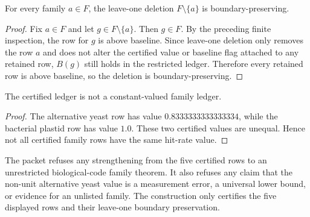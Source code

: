 \begin{theorem}
\label{thm:bioreality-q-six-family-leave-one-boundary-preservation}
For every family $a\in F$, the leave-one deletion $F\setminus\{a\}$ is boundary-preserving.
\end{theorem}

\begin{proof}
Fix $a\in F$ and let $g\in F\setminus\{a\}$.  Then $g\in F$.  By the preceding finite inspection, the row for $g$ is above baseline.  Since leave-one deletion only removes the row $a$ and does not alter the certified value or baseline flag attached to any retained row, $B(g)$ still holds in the restricted ledger.  Therefore every retained row is above baseline, so the deletion is boundary-preserving.
\end{proof}

\begin{proposition}
\label{prop:bioreality-q-six-family-nonconstant-boundary-shape}
The certified ledger is not a constant-valued family ledger.
\end{proposition}

\begin{proof}
The alternative yeast row has value $0.8333333333333334$, while the bacterial plastid row has value $1.0$.  These two certified values are unequal.  Hence not all certified family rows have the same hit-rate value.
\end{proof}

\begin{definition}
\label{def:bioreality-q-six-family-boundary-refusal}
The packet refuses any strengthening from the five certified rows to an unrestricted biological-code family theorem.  It also refuses any claim that the non-unit alternative yeast value is a measurement error, a universal lower bound, or evidence for an unlisted family.  The construction only certifies the five displayed rows and their leave-one boundary preservation.
\end{definition}

\begin{closurestatus}{\BioRealityQSixFamilyLeaveOneBoundaryLedgerUp}
  \theoryclosure{\scopedClosure}
  \formalstatus{\unformalizedV}
\end{closurestatus}